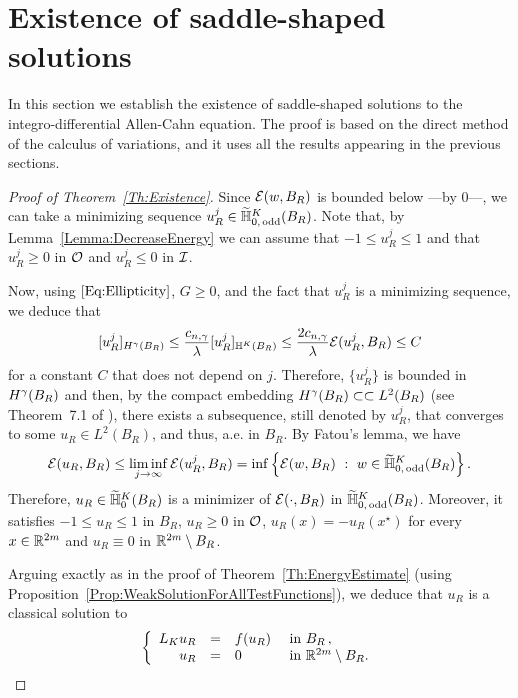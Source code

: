 \section{Existence of saddle-shaped solutions}
\label{Sec:Existence}


In this section we establish the existence of saddle-shaped solutions to the integro-differential Allen-Cahn equation. The proof is based on the direct method of the calculus of variations, and it uses all the results appearing in the previous sections.

\begin{proof}[Proof of Theorem~\ref{Th:Existence}]
Since $\mathcal{E}(w,B_R)$ is bounded below ---by $0$---, we can take a minimizing sequence $u_R^j\in \widetilde{\mathbb{H}}^K_{0, \,\mathrm{odd}}(B_R)$. Note that, by Lemma~\ref{Lemma:DecreaseEnergy} we can assume that $-1 \leq u_R^j \leq 1$ and that $u_R^j \geq 0$ in $\mathcal{O}$ and $u_R^j \leq 0$ in $\mathcal{I}$. 

Now, using $\eqref{Eq:Ellipticity}$, $G\geq 0$, and the fact that $u_R^j$ is a minimizing sequence, we deduce that 
$$
[u_R^j]_{H^\gamma(B_R)} \leq \dfrac{c_{n,\gamma}}{\lambda}  [u_R^j]_{\mathbb{H}^K(B_R)}\leq \dfrac{2 c_{n,\gamma}}{\lambda}\mathcal{E}(u_R^j,B_R) \leq C
$$
for a constant $C$ that does not depend on $j$. Therefore, $\{u_R^j\}$ is bounded in $H^\gamma(B_R)$ and then, by the compact embedding $H^\gamma(B_R) \subset \subset L^2(B_R)$ (see Theorem~7.1 of \cite{HitchhikerGuide}), there exists a subsequence, still denoted by $u_R^j$,  that converges to some $u_R \in L^2(B_R)$, and thus, a.e. in $B_R$. By Fatou's lemma, we have
$$
\mathcal{E}(u_R, B_R)
\leq \liminf_{j\to \infty} \mathcal{E}(u_R^j, B_R) = \inf \left \{ \mathcal{E}(w, B_R) \ : \ w \in \widetilde{\mathbb{H}}^K_{0, \,\mathrm{odd}}(B_R) \right \}.
$$
Therefore, $u_R \in \widetilde{\mathbb{H}}^K_0(B_R)$ is a minimizer of $\mathcal{E}(\cdot, B_R)$ in $\widetilde{\mathbb{H}}^K_{0, \,\mathrm{odd}}(B_R)$. Moreover, it satisfies $-1\leq u_R \leq 1$ in $B_R$, $u_R\geq 0$ in $\mathcal{O}$, $u_R(x) = - u_R(x^\star)$ for every $x\in \mathbb{R}^{2m}$ and $u_R \equiv 0 $ in $\mathbb{R}^{2m} \setminus B_R$.

Arguing exactly as in the proof of Theorem~\ref{Th:EnergyEstimate} (using Proposition~\ref{Prop:WeakSolutionForAllTestFunctions}), we deduce that $u_R$ is a classical solution to
\begin{equation*}
	\left\{\begin{array}{rcll}
	L_K  u_R &=& f(u_R) & \textrm{ in } B_R\,,\\
	u_R &=& 0 & \textrm{ in }\mathbb{R}^{2m} \setminus B_R.
	\end{array} \right.
\end{equation*}



\end{proof}
